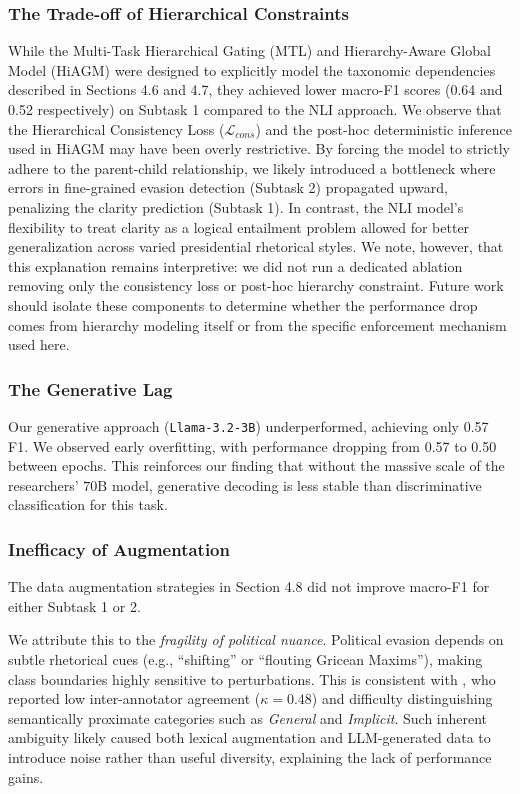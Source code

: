 \documentclass[11pt]{article}
\begin{document}
\subsubsection{The Trade-off of Hierarchical Constraints}
While the Multi-Task Hierarchical Gating (MTL) and Hierarchy-Aware Global Model (HiAGM) were designed to explicitly model the taxonomic dependencies described in Sections 4.6 and 4.7, they achieved lower macro-F1 scores (0.64 and 0.52 respectively) on Subtask 1 compared to the NLI approach. We observe that the Hierarchical Consistency Loss ($\mathcal{L}_{cons}$) and the post-hoc deterministic inference used in HiAGM may have been overly restrictive. By forcing the model to strictly adhere to the parent-child relationship, we likely introduced a bottleneck where errors in fine-grained evasion detection (Subtask 2) propagated upward, penalizing the clarity prediction (Subtask 1). In contrast, the NLI model's flexibility to treat clarity as a logical entailment problem allowed for better generalization across varied presidential rhetorical styles. We note, however, that this explanation remains interpretive: we did not run a dedicated ablation removing only the consistency loss or post-hoc hierarchy constraint. Future work should isolate these components to determine whether the performance drop comes from hierarchy modeling itself or from the specific enforcement mechanism used here.

\subsubsection{The Generative Lag}
Our generative approach (\texttt{Llama-3.2-3B}) underperformed, achieving only 0.57 F1. We observed early overfitting, with performance dropping from 0.57 to 0.50 between epochs. This reinforces our finding that without the massive scale of the researchers' $70\text{B}$ model, generative decoding is less stable than discriminative classification for this task.

\subsubsection{Inefficacy of Augmentation}
The data augmentation strategies in Section 4.8 did not improve macro-F1 for either Subtask 1 or 2.

We attribute this to the \textit{fragility of political nuance}. Political evasion depends on subtle rhetorical cues (e.g., ``shifting'' or ``flouting Gricean Maxims''), making class boundaries highly sensitive to perturbations. This is consistent with \citet{b4}, who reported low inter-annotator agreement ($\kappa = 0.48$) and difficulty distinguishing semantically proximate categories such as \textit{General} and \textit{Implicit}. Such inherent ambiguity likely caused both lexical augmentation and LLM-generated data to introduce noise rather than useful diversity, explaining the lack of performance gains.
\end{document}
